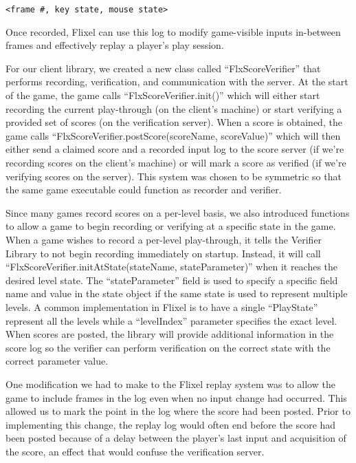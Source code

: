 \documentclass [11pt, twocolumn] {article}
\begin{document}
\begin{verbatim}
<frame #, key state, mouse state>
\end{verbatim} 

Once recorded, Flixel can use this log to modify game-visible inputs in-between frames and effectively replay a player's play session. 

For our client library, we created a new class called ``FlxScoreVerifier'' that performs recording, verification, and communication with the server. At the start of the game, the game calls ``FlxScoreVerifier.init()'' which will either start recording the current play-through (on the client's machine) or start verifying a provided set of scores (on the verification server). When a score is obtained, the game calls ``FlxScoreVerifier.postScore(scoreName, scoreValue)'' which will then either send a claimed score and a recorded input log to the score server (if we're recording scores on the client's machine) or will mark a score as verified (if we're verifying scores on the server). This system was chosen to be symmetric so that the same game executable could function as recorder and verifier. 

Since many games record scores on a per-level basis, we also introduced functions to allow a game to begin recording or verifying at a specific state in the game. When a game wishes to record a per-level play-through, it tells the Verifier Library to not begin recording immediately on startup. Instead, it will call ``FlxScoreVerifier.initAtState(stateName, stateParameter)'' when it reaches the desired level state. The ``stateParameter'' field is used to specify a specific field name and value in the state object if the same state is used to represent multiple levels. A common implementation in Flixel is to have a single ``PlayState'' represent all the levels while a ``levelIndex'' parameter specifies the exact level. When scores are posted, the library will provide additional information in the score log so the verifier can perform verification on the correct state with the correct parameter value.  

One modification we had to make to the Flixel replay system was to allow the game to include frames in the log even when no input change had occurred. This allowed us to mark the point in the log where the score had been posted. Prior to implementing this change, the replay log would often end before the score had been posted because of a delay between the player's last input and acquisition of the score, an effect that would confuse the verification server. 
\end{document}
